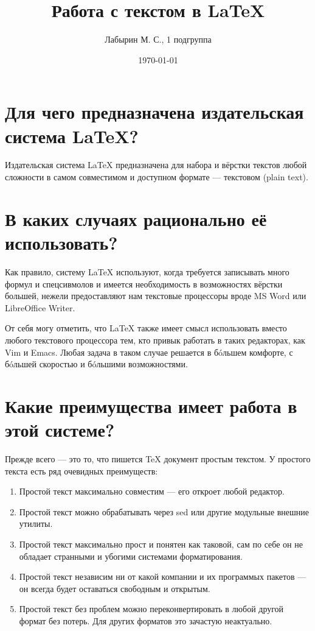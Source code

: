 \documentclass[a4paper,12pt]{article} %
\author{Лабырин М. С., 1 подгруппа}
\title{Работа с текстом в \LaTeX}
\date{\today}
\begin{document}

\maketitle

\section{Для чего предназначена издательская система \LaTeX?}

Издательская система \LaTeX{} предназначена для набора и вёрстки текстов любой сложности в самом совместимом и доступном формате --- текстовом (plain text).

\section{В каких случаях рационально её использовать?}

Как правило, систему \LaTeX{} используют, когда требуется записывать много формул и спецсивмолов и имеется необходимость в возможностях вёрстки большей, нежели предоставляют нам текстовые процессоры вроде MS Word или LibreOffice Writer.

От себя могу отметить, что \LaTeX{} также имеет смысл использовать вместо любого текстового процессора тем, кто привык работать в таких редакторах, как Vim и Emacs.
Любая задача в таком случае решается в б\'oльшем комфорте, с б\'oльшей скоростью и б\'oльшими возможностями.

\section{Какие преимущества имеет работа в этой системе?}

Прежде всего --- это то, что пишется \TeX{} документ простым текстом.
У простого текста есть ряд очевидных преимуществ:
\begin{enumerate}
  \item Простой текст максимально совместим --- его откроет любой редактор.
  \item Простой текст можно обрабатывать через sed или другие модульные внешние утилиты.
  \item Простой текст максимально прост и понятен как таковой, сам по себе он не обладает странными и убогими системами форматирования.
  \item Простой текст независим ни от какой компании и их программых пакетов --- он всегда будет оставаться свободным и открытым.
  \item Простой текст без проблем можно переконвертировать в любой другой формат без потерь.
    Для других форматов это зачастую неактуально.
\end{enumerate}
\end{document}
